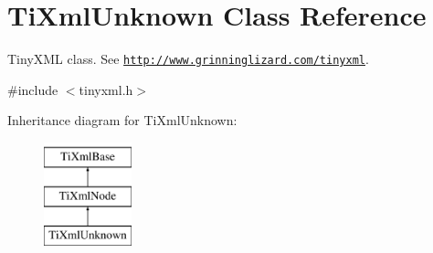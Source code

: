 \hypertarget{class_ti_xml_unknown}{}\section{Ti\+Xml\+Unknown Class Reference}
\label{class_ti_xml_unknown}


Tiny\+X\+ML class. See \href{http://www.grinninglizard.com/tinyxml}{\tt http\+://www.\+grinninglizard.\+com/tinyxml}.  




{\ttfamily \#include $<$tinyxml.\+h$>$}

Inheritance diagram for Ti\+Xml\+Unknown\+:\begin{figure}[H]
\begin{center}
\leavevmode
\includegraphics[height=3.000000cm]{class_ti_xml_unknown}
\end{center}
\end{figure}
